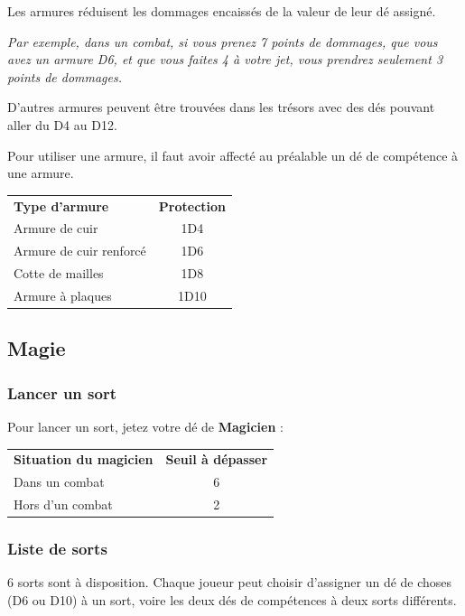 \documentclass[a4paper, 11pt, twoside]{article}
\begin{document}
Les armures réduisent les dommages encaissés de la valeur de leur dé assigné.

\emph{Par exemple, dans un combat, si vous prenez 7 points de dommages, que vous avez un armure D6, et que vous faites 4 à votre jet, vous prendrez seulement 3 points de dommages.}

D'autres armures peuvent être trouvées dans les trésors avec des dés pouvant aller du D4 au D12.

Pour utiliser une armure, il faut avoir affecté au préalable un dé de compétence à une armure.

\begin{longtable}{lc}
\textbf{Type d'armure} & \textbf{Protection}\\
Armure de cuir & 1D4\\
Armure de cuir renforcé & 1D6\\
Cotte de mailles & 1D8\\
Armure à plaques & 1D10\\
\end{longtable}

\subsection{Magie}
\label{sec:orga281206}
\subsubsection{Lancer un sort}
\label{sec:orgc7c6fce}

Pour lancer un sort, jetez votre dé de \textbf{Magicien} :

\begin{longtable}{lc}
\textbf{Situation du magicien} & \textbf{Seuil à dépasser}\\
Dans un combat & 6\\
Hors d'un combat & 2\\
\end{longtable}

\subsubsection{Liste de sorts}
\label{sec:org1558032}

6 sorts sont à disposition. Chaque joueur peut choisir d'assigner un dé de choses (D6 ou D10) à un sort, voire les deux dés de compétences à deux sorts différents.
\end{document}
